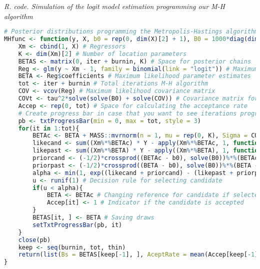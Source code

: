\begin{tcolorbox}[enhanced,width=4.67in,center upper,
	fontupper=\large\bfseries,drop shadow southwest,sharp corners]
	\textit{R. code. Simulation of the logit model estimation programming our M-H algorithm}
	\begin{VF}
		\begin{lstlisting}[language=R]		
# Posterior distributions programming the Metropolis-Hastings algorithm
MHfunc <- function(y, X, b0 = rep(0, dim(X)[2] + 1), B0 = 1000*diag(dim(X)[2] + 1), tau = 1, iter = 6000, burnin = 1000, thin = 5){
	Xm <- cbind(1, X) # Regressors
	K <- dim(Xm)[2] # Number of location parameters
	BETAS <- matrix(0, iter + burnin, K) # Space for posterior chains
	Reg <- glm(y ~ Xm - 1, family = binomial(link = "logit")) # Maximum likelihood estimation
	BETA <- Reg$coefficients # Maximum likelihood parameter estimates 
	tot <- iter + burnin # Total iterations M-H algorithm
	COV <- vcov(Reg) # Maximum likelihood covariance matrix
	COVt <- tau^2*solve(solve(B0) + solve(COV)) # Covariance matrix for the proposal distribution
	Accep <- rep(0, tot) # Space for calculating the acceptance rate
	# Create progress bar in case that you want to see iterations progress
	pb <- txtProgressBar(min = 0, max = tot, style = 3)
	for(it in 1:tot){
		BETAc <- BETA + MASS::mvrnorm(n = 1, mu = rep(0, K), Sigma = COVt) # Candidate location parameter
		likecand <- sum((Xm%*%BETAc) * Y - apply(Xm%*%BETAc, 1, function(x) log(1 + exp(x)))) # Log likelihood for the candidate
		likepast <- sum((Xm%*%BETA) * Y - apply((Xm%*%BETA), 1, function(x) log(1 + exp(x)))) # Log likelihood for the actual draw
		priorcand <- (-1/2)*crossprod((BETAc - b0), solve(B0))%*%(BETAc - b0) # Log prior for candidate
		priorpast <- (-1/2)*crossprod((BETA - b0), solve(B0))%*%(BETA - b0) # Log prior for actual draw
		alpha <- min(1, exp((likecand + priorcand) - (likepast + priorpast))) #Probability of selecting candidate
		u <- runif(1) # Decision rule for selecting candidate
		if(u < alpha){
			BETA <- BETAc # Changing reference for candidate if selected
			Accep[it] <- 1 # Indicator if the candidate is accepted
		} 
		BETAS[it, ] <- BETA # Saving draws
		setTxtProgressBar(pb, it)
	}
	close(pb)
	keep <- seq(burnin, tot, thin)
	return(list(Bs = BETAS[keep[-1], ], AceptRate = mean(Accep[keep[-1]])))
}
\end{lstlisting}
	\end{VF}
\end{tcolorbox} 

